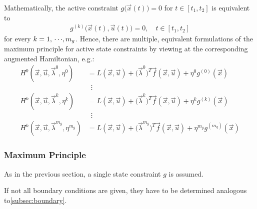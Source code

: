 				Mathematically, the active constraint \( g\big(\vec{x}(t)\big) = 0 \) for \( t \in [t_1, t_2] \) is equivalent to
				\begin{align*}
					g^{(k)}\big(\vec{x}(t), \vec{u}(t)\big) = 0,\quad t \in [t_1, t_2]
				\end{align*}
				for every \( k = 1,\,\cdots\!,m_g \). Hence, there are multiple, equivalent formulations of the maximum principle for active state constraints by viewing at the corresponding augmented Hamiltonian, e.g.:
				\begin{align*}
					H^0(\vec{x}, \vec{u}, \vec{\lambda}^0, \eta^0)         & = L(\vec{x}, \vec{u}) + \big(\vec{\lambda}^0\big)^T \vec{f}(\vec{x}, \vec{u}) + \eta^0 g^{(0)}(\vec{x})           \\
					                                                       & \,\,\,\vdots                                                                                                      \\
					H^k(\vec{x}, \vec{u}, \vec{\lambda}^k, \eta^k)         & = L(\vec{x}, \vec{u}) + \big(\vec{\lambda}^k\big)^T \vec{f}(\vec{x}, \vec{u}) + \eta^k g^{(k)}(\vec{x})           \\
					                                                       & \,\,\,\vdots                                                                                                      \\
					H^k(\vec{x}, \vec{u}, \vec{\lambda}^{m_g}, \eta^{m_g}) & = L(\vec{x}, \vec{u}) + \big(\vec{\lambda}^{m_g}\big)^T \vec{f}(\vec{x}, \vec{u}) + \eta^{m_g} g^{(m_g)}(\vec{x})
				\end{align*}

			\subsubsection{Maximum Principle}
				As in the previous section, a single state constraint \(g\) is assumed.

				If not all boundary conditions are given, they have to be determined analogous to\autoref{subsec:boundary}.

